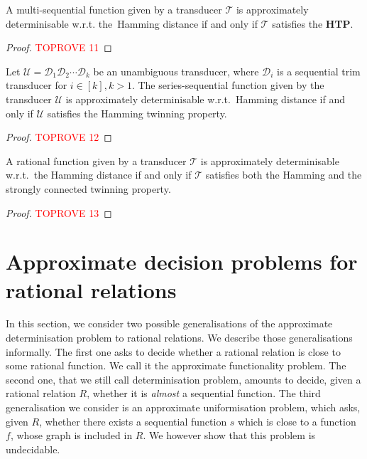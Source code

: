 \documentclass[a4paper,UKenglish,cleveref, autoref, thm-restate,authorcolumns, colorlinks]{lipics-v2021}
\newcommand\calD{\mathcal{D}}
\newcommand\calT{\mathcal{T}}
\newcommand\calU{\mathcal{U}}
\newcommand{\HTP}[0]{\textbf{HTP}}
\begin{document}
{\begin{lemma} \label{lemma:multiseqapproxHamming}
    A multi-sequential function given by a transducer $\calT$
    is approximately determinisable w.r.t. the~Hamming distance
    if and only if $\calT$ satisfies the \HTP{}.
\end{lemma}

\begin{proof}\textcolor{red}{TOPROVE 11}\end{proof}
\begin{lemma} \label{lemma:seriesseqapproxHamming}
    Let $\calU = \calD_1 \calD_2 \cdots \calD_k$ be an unambiguous transducer,
    where $\calD_i$ is a sequential trim transducer for $i \in [k], k>1$.
    The series-sequential function given by the transducer $\calU$
    is approximately determinisable w.r.t.~Hamming distance
    if and only if $\calU$ satisfies the Hamming twinning property.
\end{lemma}



\begin{proof}\textcolor{red}{TOPROVE 12}\end{proof}

\begin{lemma}\label{theorem:approxdetHamming}
    A rational function given by a transducer $\calT$
    is approximately determinisable w.r.t.~the Hamming distance
    if and only if $\calT$ satisfies
    both the Hamming and the strongly connected twinning property.
\end{lemma}
\begin{proof}\textcolor{red}{TOPROVE 13}\end{proof}

\section{Approximate decision problems for rational relations}

In this section, we consider two possible generalisations of the approximate determinisation problem to rational relations. We describe those generalisations informally. The first one asks to decide whether a rational relation is close to some rational function. We call it the approximate functionality problem. The second one, that we still call determinisation problem, amounts to decide, given a rational relation $R$, whether it is \emph{almost} a sequential function. The third generalisation we consider is an approximate uniformisation problem, which asks, given $R$, whether there exists a sequential function $s$ which is close to a function $f$, whose graph is included in $R$. We however show that this problem is undecidable. 

}
\end{document}
